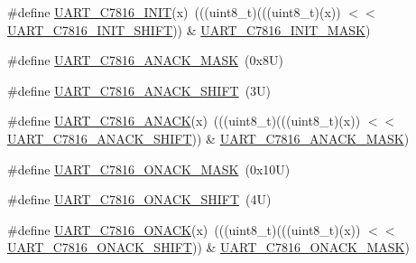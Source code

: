 \begin{DoxyCompactItemize}
\item 
\#define \mbox{\hyperlink{group___u_a_r_t___register___masks_ga5d84e7b71c75740849fcda8982c796b6}{U\+A\+R\+T\+\_\+\+C7816\+\_\+\+I\+N\+IT}}(x)~(((uint8\+\_\+t)(((uint8\+\_\+t)(x)) $<$$<$ \mbox{\hyperlink{group___u_a_r_t___register___masks_ga7fe58f80db753fac78feefc4ab257d0d}{U\+A\+R\+T\+\_\+\+C7816\+\_\+\+I\+N\+I\+T\+\_\+\+S\+H\+I\+FT}})) \& \mbox{\hyperlink{group___u_a_r_t___register___masks_ga52afeea9fbaec9489c45792a907b195b}{U\+A\+R\+T\+\_\+\+C7816\+\_\+\+I\+N\+I\+T\+\_\+\+M\+A\+SK}})
\item 
\#define \mbox{\hyperlink{group___u_a_r_t___register___masks_ga7d492736d5d2ffba794d54fa0d6b8d92}{U\+A\+R\+T\+\_\+\+C7816\+\_\+\+A\+N\+A\+C\+K\+\_\+\+M\+A\+SK}}~(0x8\+U)
\item 
\#define \mbox{\hyperlink{group___u_a_r_t___register___masks_gae5c391d165239e4ed2d80e7ac31a0232}{U\+A\+R\+T\+\_\+\+C7816\+\_\+\+A\+N\+A\+C\+K\+\_\+\+S\+H\+I\+FT}}~(3\+U)
\item 
\#define \mbox{\hyperlink{group___u_a_r_t___register___masks_ga4bfeb7fd58add67276f19313c42f1d1c}{U\+A\+R\+T\+\_\+\+C7816\+\_\+\+A\+N\+A\+CK}}(x)~(((uint8\+\_\+t)(((uint8\+\_\+t)(x)) $<$$<$ \mbox{\hyperlink{group___u_a_r_t___register___masks_gae5c391d165239e4ed2d80e7ac31a0232}{U\+A\+R\+T\+\_\+\+C7816\+\_\+\+A\+N\+A\+C\+K\+\_\+\+S\+H\+I\+FT}})) \& \mbox{\hyperlink{group___u_a_r_t___register___masks_ga7d492736d5d2ffba794d54fa0d6b8d92}{U\+A\+R\+T\+\_\+\+C7816\+\_\+\+A\+N\+A\+C\+K\+\_\+\+M\+A\+SK}})
\item 
\#define \mbox{\hyperlink{group___u_a_r_t___register___masks_ga031dcabb12ed66e1a74a735e962c0418}{U\+A\+R\+T\+\_\+\+C7816\+\_\+\+O\+N\+A\+C\+K\+\_\+\+M\+A\+SK}}~(0x10\+U)
\item 
\#define \mbox{\hyperlink{group___u_a_r_t___register___masks_ga969b1c4c1e85e7745b73b993b93b4c6f}{U\+A\+R\+T\+\_\+\+C7816\+\_\+\+O\+N\+A\+C\+K\+\_\+\+S\+H\+I\+FT}}~(4\+U)
\item 
\#define \mbox{\hyperlink{group___u_a_r_t___register___masks_ga200b02f63886684317bac797dae1e51f}{U\+A\+R\+T\+\_\+\+C7816\+\_\+\+O\+N\+A\+CK}}(x)~(((uint8\+\_\+t)(((uint8\+\_\+t)(x)) $<$$<$ \mbox{\hyperlink{group___u_a_r_t___register___masks_ga969b1c4c1e85e7745b73b993b93b4c6f}{U\+A\+R\+T\+\_\+\+C7816\+\_\+\+O\+N\+A\+C\+K\+\_\+\+S\+H\+I\+FT}})) \& \mbox{\hyperlink{group___u_a_r_t___register___masks_ga031dcabb12ed66e1a74a735e962c0418}{U\+A\+R\+T\+\_\+\+C7816\+\_\+\+O\+N\+A\+C\+K\+\_\+\+M\+A\+SK}})
\end{DoxyCompactItemize}
